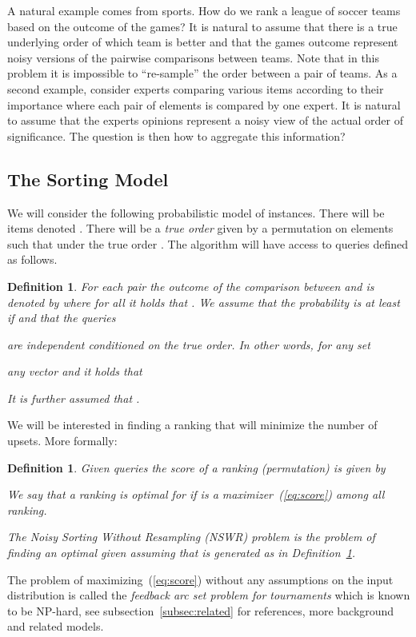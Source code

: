 \documentclass[11pt]{article}
\newtheorem{definition}[theorem]{Definition}
\begin{document}
A natural example comes from sports. How do we rank a league of soccer teams 
based on the outcome of the games? It is natural to assume that there is a true 
underlying order of which team is better and that the games outcome represent 
noisy versions of the pairwise comparisons between teams. Note that in 
this problem it is impossible to ``re-sample'' the order between 
a pair of teams.  
As a second example, consider experts comparing various items  
according to their importance where each pair of elements is compared by one 
expert. 
It is natural to assume that the experts opinions 
represent a noisy view of the actual order of significance. The question is 
then how to  aggregate this information? 

\subsection{The Sorting Model}
We will consider the following probabilistic model of instances. 
There will be  items denoted .  
There will be a {\em true order} given by a permutation  on 
 elements such that under the true order 
. 
The algorithm will have access to  queries defined as follows.

\begin{definition} \label{def:noise}
For each pair  the outcome of the comparison between  and 
 is denoted by  where for all  it holds 
that . We assume that the probability 
 is at least  if  
and that the queries 

are independent conditioned on the true order. 
In other words, for any set 
 
any vector  and 
 it holds that 

It is further assumed that .
\end{definition}

We will be interested in finding a ranking that will minimize the number of 
upsets. More formally:
\begin{definition}
Given  queries  the score  
of a ranking (permutation)  is given by 

We say that a ranking  is {\em optimal} for  if  
is a maximizer~(\ref{eq:score}) among all ranking. 

The {\em Noisy Sorting Without Resampling (NSWR)} 
problem is the problem of finding 
an optimal  given  assuming that  is generated as in 
Definition~\ref{def:noise}.
\end{definition}
The problem of maximizing~(\ref{eq:score}) without any assumptions on the 
input distribution is called the {\em feedback arc set problem for tournaments} 
which is known to be NP-hard, see subsection~\ref{subsec:related} 
for references, more background and related models. 
\end{document}
